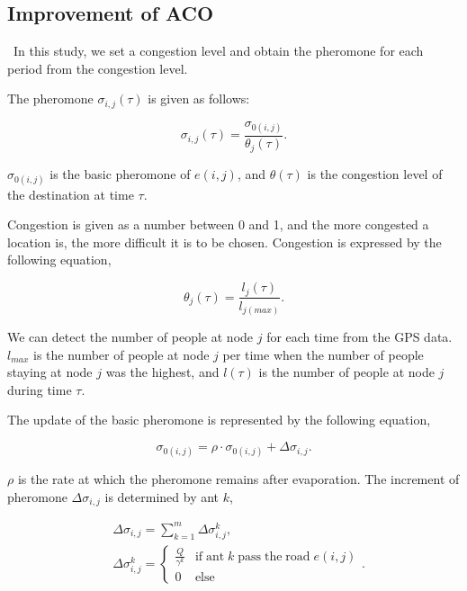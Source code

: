 \documentclass[conference]{IEEEtran}
\begin{document}
\subsection{Improvement of ACO}
\ In this study, we set a congestion level and obtain the pheromone for each period from the congestion level.
\par The pheromone $\sigma _{i,j}(\tau)$ is given as follows:

\begin{equation}
{{\sigma _{i,j}}(\tau )} = \frac {\sigma _{0(i,j)}}{\theta_j(\tau)}.
\end{equation}

\par $\sigma_{0(i,j)}$ is the basic pheromone of $e(i,j)$, and $\theta(\tau)$ is the congestion level of the destination at time $\tau$.
\par Congestion is given as a number between 0 and 1, and the more congested a location is, the more difficult it is to be chosen.
Congestion is expressed by the following equation,

\begin{equation}
\label{theta}
 \theta_j(\tau) = {\frac {l_j (\tau)}{l_{j(max)}}}.
\end{equation}

\par We can detect the number of people at node $j$ for each time from the GPS data.
$l_{max}$ is the number of people at node $j$ per time when the number of people staying at node $j$ was the highest, and ${l (\tau)}$ is the number of people at node $j$ during time $\tau$.
\par The update of the basic pheromone is represented by the following equation,

\begin{equation}
{\sigma _{0(i,j)}} = \rho \cdot {\sigma _{0(i,j)}} + \Delta {\sigma _{i,j}}.
\end{equation}

\par $\rho$ is the rate at which the pheromone remains after evaporation.
The increment of pheromone $\Delta {\sigma _{i,j}}$ is determined by ant $k$,

\begin{align}
& \Delta {\sigma _{i,j}}= \sum\nolimits_{k = 1}^m {\Delta \sigma _{i,j}^k}, \\
& \Delta \sigma _{i,j}^k = \begin{cases} \frac{Q}{{\gamma ^k}} & {\text{if}}\;{\text{ant}}\;k\;{\text{pass}}\;{\text{the}}\;{\text{road}}\;e\left({i,j}\right) \\ 0 & {\text{else }} \end{cases}.
\label{final}
 \end{align} 
 
\end{document}

